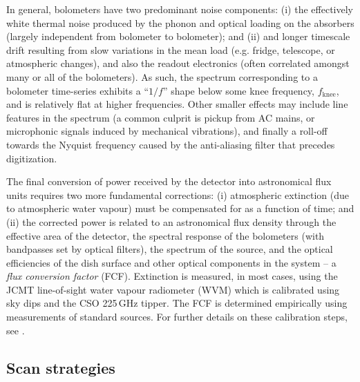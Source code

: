 \documentclass[useAMS,usenatbib,nofootinbib]{mn2e}
\begin{document}
In general, bolometers have two predominant noise components: (i) the
effectively white thermal noise produced by the phonon and optical
loading on the absorbers (largely independent from bolometer to
bolometer); and (ii) and longer timescale drift resulting from slow
variations in the mean load (e.g. fridge, telescope, or atmospheric
changes), and also the readout electronics (often correlated amongst
many or all of the bolometers). As such, the spectrum corresponding to
a bolometer time-series exhibits a ``$1/f$'' shape below some knee
frequency, $f_\mathrm{knee}$, and is relatively flat at higher
frequencies. Other smaller effects may include line features in the
spectrum (a common culprit is pickup from AC mains, or microphonic
signals induced by mechanical vibrations), and finally a roll-off
towards the Nyquist frequency caused by the anti-aliasing filter that
precedes digitization.

The final conversion of power received by the detector into
astronomical flux units requires two more fundamental corrections: (i)
atmospheric extinction (due to atmospheric water vapour) must be
compensated for as a function of time; and (ii) the corrected power is
related to an astronomical flux density through the effective area of
the detector, the spectral response of the bolometers (with bandpasses
set by optical filters), the spectrum of the source, and the optical
efficiencies of the dish surface and other optical components in the
system -- a \emph{flux conversion factor} (FCF). Extinction is
measured, in most cases, using the JCMT line-of-sight water vapour
radiometer (WVM) which is calibrated using sky dips and the CSO
225\,GHz tipper. The FCF is determined empirically using measurements
of standard sources. For further details on these calibration steps,
see \citet{dempsey2012}.


\subsection{Scan strategies}
\label{sec:scan}
\end{document}
